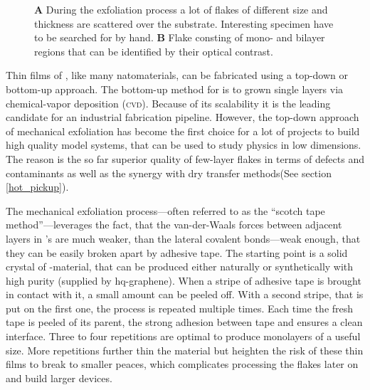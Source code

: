 \begin{figure}
\begin{subfigure}{0.349\textwidth}
\end{subfigure}
\caption{\textbf{A} During the exfoliation process a lot of flakes of different size and thickness are scattered over the substrate. Interesting specimen have to be searched for by hand. \textbf{B} Flake consting of mono- and bilayer regions that can be identified by their optical contrast.}
	\label{flakes}
\end{figure}

Thin films of \tmds\!, like many natomaterials, can be fabricated using a top-down or bottom-up approach. The bottom-up method for \tmds is to grown single layers via chemical-vapor deposition (\textsc{cvd})\cite{chen_chemical_2016}. Because of its scalability it is the leading candidate for an industrial fabrication pipeline. However, the top-down approach of mechanical exfoliation has become the first choice for a lot of projects to build high quality model systems, that can be used to study physics in low dimensions\cite{geim_rise_2007}. The reason is the so far superior quality of few-layer flakes in terms of defects and contaminants as well as the synergy with dry transfer methods(See section \ref{hot_pickup}). 

The mechanical exfoliation process---often referred to as the ``scotch tape method''---leverages the fact, that the van-der-Waals forces between adjacent layers in \tmd's are much weaker, than the lateral covalent bonds---weak enough, that they can be easily broken apart by adhesive tape. The starting point is a solid crystal of \tmd-material, that can be produced either naturally or synthetically with high purity (supplied by hq-graphene). When a stripe of adhesive tape is brought in contact with it, a small amount can be peeled off. With a second stripe, that is put on the first one, the process is repeated multiple times. Each time the fresh tape is peeled of its parent, the strong adhesion between tape and \tmdg ensures a clean interface. Three to four repetitions are optimal to produce monolayers of a useful size. More repetitions further thin the material but heighten the risk of these thin films to break to smaller peaces, which complicates processing the flakes later on and build larger devices. 

